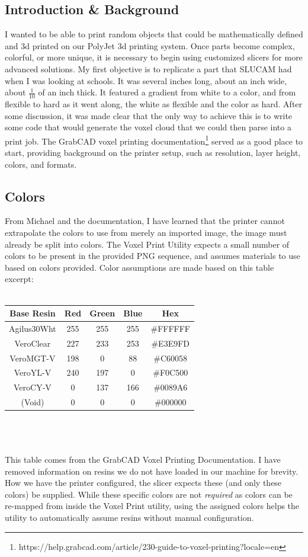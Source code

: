 \documentclass{article}
\begin{document}
\begin{multicols}{2}
\section{Introduction \& Background}
I wanted to be able to print random objects that could be mathematically defined and 3d printed on our PolyJet 3d printing system. Once parts become complex, colorful, or more unique, it is necessary to begin using customized slicers for more advanced solutions. My first objective is to replicate a part that SLUCAM had when I was looking at schools. It was several inches long, about an inch wide, about $\frac{1}{10}$ of an inch thick. It featured a gradient from white to a color, and from flexible to hard as it went along, the white as flexible and the color as hard. After some discussion, it was made clear that the only way to achieve this is to write some code that would generate the voxel cloud that we could then parse into a print job. The GrabCAD voxel printing documentation\footnote{https://help.grabcad.com/article/230-guide-to-voxel-printing?locale=en} served as a good place to start, providing background on the printer setup, such as resolution, layer height, colors, and formats. 

\subsection{Colors} From Michael and the documentation, I have learned that the printer cannot extrapolate the colors to use from merely an imported image, the image must already be split into colors. The Voxel Print Utility expects a small number of colors to be present in the provided PNG sequence, and assumes materials to use based on colors provided. Color assumptions are made based on this table excerpt:
\\\\
\noindent
\begin{tabular}{|c||c|c|c||c|}
    \hline
    Base Resin & Red & Green & Blue & Hex \\
    \hline
    Agilus30Wht & 255 & 255 & 255 & \#FFFFFF \\
    VeroClear & 227 & 233 & 253 & \#E3E9FD \\
    VeroMGT-V & 198 & 0 & 88 & \#C60058 \\
    VeroYL-V & 240 & 197 & 0 & \#F0C500 \\
    VeroCY-V & 0 & 137 & 166 & \#0089A6 \\
    (Void) & 0 & 0 & 0 & \#000000 \\
    \hline
\end{tabular}
\\\\\\
\noindent
This table comes from the GrabCAD Voxel Printing Documentation. I have removed information on resins we do not have loaded in our machine for brevity. How we have the printer configured, the slicer expects these (and only these colors) be supplied. While these specific colors are not \textit{required} as colors can be re-mapped from inside the Voxel Print utility, using the assigned colors helps the utility to automatically assume resins without manual configuration. 


\end{multicols}
\end{document}

